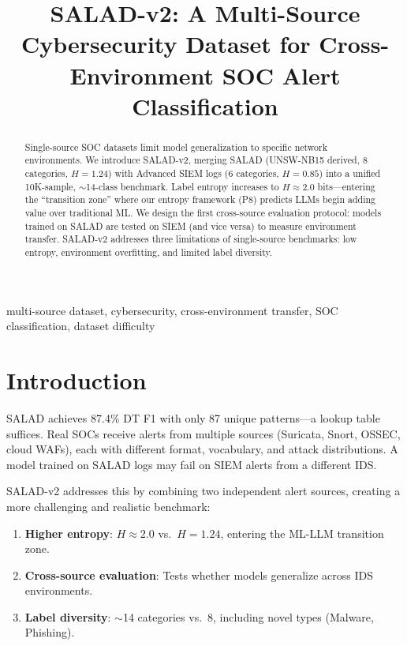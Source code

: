 \documentclass[journal]{IEEEtran}
\begin{document}
\title{SALAD-v2: A Multi-Source Cybersecurity Dataset for Cross-Environment SOC Alert Classification}
\author{}
\maketitle

\begin{abstract}
Single-source SOC datasets limit model generalization to specific network environments. We introduce SALAD-v2, merging SALAD (UNSW-NB15 derived, 8 categories, $H=1.24$) with Advanced SIEM logs (6 categories, $H=0.85$) into a unified 10K-sample, $\sim$14-class benchmark. Label entropy increases to $H\approx2.0$ bits---entering the ``transition zone'' where our entropy framework (P8) predicts LLMs begin adding value over traditional ML. We design the first cross-source evaluation protocol: models trained on SALAD are tested on SIEM (and vice versa) to measure environment transfer. SALAD-v2 addresses three limitations of single-source benchmarks: low entropy, environment overfitting, and limited label diversity.
\end{abstract}
\begin{IEEEkeywords}
multi-source dataset, cybersecurity, cross-environment transfer, SOC classification, dataset difficulty
\end{IEEEkeywords}

\section{Introduction}
SALAD achieves 87.4\% DT F1 with only 87 unique patterns---a lookup table suffices. Real SOCs receive alerts from multiple sources (Suricata, Snort, OSSEC, cloud WAFs), each with different format, vocabulary, and attack distributions. A model trained on SALAD logs may fail on SIEM alerts from a different IDS.

SALAD-v2 addresses this by combining two independent alert sources, creating a more challenging and realistic benchmark:
\begin{enumerate}
\item \textbf{Higher entropy}: $H\approx2.0$ vs.\ $H=1.24$, entering the ML-LLM transition zone.
\item \textbf{Cross-source evaluation}: Tests whether models generalize across IDS environments.
\item \textbf{Label diversity}: $\sim$14 categories vs.\ 8, including novel types (Malware, Phishing).
\end{enumerate}
\end{document}
